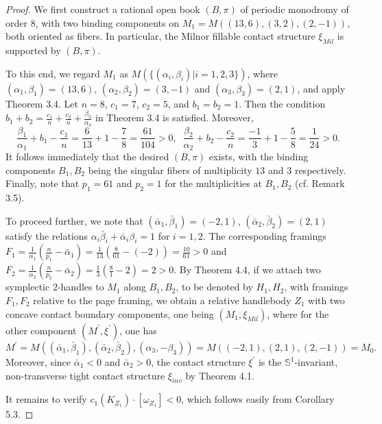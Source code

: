 \documentclass[11pt]{amsart}
\theoremstyle{plain}
\numberwithin{theorem}{section}
\theoremstyle{definition}
\newcommand{\s}{{\mathbb S}}
\begin{document}
\begin{proof}
We first construct a rational open book $(B,\pi)$ of periodic monodromy of order $8$, with two binding components on $M_1=M((13,6), (3,2), (2,-1))$, both oriented as fibers. In particular, the Milnor fillable contact structure 
$\xi_{Mil}$ is supported by $(B,\pi)$. 

To this end, we regard $M_1$ as $M(\{(\alpha_i,\beta_i)|i=1,2,3\})$, where 
$(\alpha_1,\beta_1)=(13,6)$, $(\alpha_2,\beta_2)=(3,-1)$ and $(\alpha_3,\beta_3)=(2,1)$, and apply
Theorem 3.4. Let $n=8$, $c_1=7$, $c_2=5$, and $b_1=b_2=1$. Then the condition $b_1+b_2=\frac{c_1}{n}+\frac{c_2}{n}+\frac{\beta_3}{\alpha_3}$ in Theorem 3.4 is satisfied. Moreover,
$$
\frac{\beta_1}{\alpha_1}+b_1-\frac{c_1}{n}=\frac{6}{13}+1-\frac{7}{8}=\frac{61}{104}>0, \;\;
\frac{\beta_2}{\alpha_2}+b_2-\frac{c_2}{n}=\frac{-1}{3}+1-\frac{5}{8}=\frac{1}{24}>0.
$$
It follows immediately that the desired $(B,\pi)$ exists, with the binding components $B_1,B_2$ being the singular fibers of multiplicity $13$ and $3$ respectively. Finally, note that $p_1=61$ and $p_2=1$
for the multiplicities at $B_1,B_2$ (cf. Remark 3.5). 

To proceed further,  we note that $(\bar{\alpha}_1, \bar{\beta}_1)=(-2,1)$, 
$(\bar{\alpha}_2, \bar{\beta}_2)=(2,1)$ satisfy the relations $\alpha_i\bar{\beta}_i+\bar{\alpha}_i\beta_i=1$ for $i=1,2$. The corresponding framings $F_1=\frac{1}{\alpha_1}(\frac{n}{p_1}-\bar{\alpha}_1)=\frac{1}{13}(\frac{8}{61}-(-2))=\frac{10}{61}>0$ and $F_2=\frac{1}{\alpha_2}(\frac{n}{p_2}-\bar{\alpha}_2)=\frac{1}{3}(\frac{8}{1}-2)=2>0$. By Theorem 4.4, if we attach two symplectic $2$-handles to $M_1$ along $B_1, B_2$, to be denoted by $H_1,H_2$, with framings $F_1,F_2$ relative to the page framing, we obtain a relative handlebody $Z_1$ with two concave contact boundary components, one being $(M_1,\xi_{Mil})$, where for the other component 
$(M^\prime,\xi^\prime)$, one has 
$$
M^\prime=M((\bar{\alpha}_1,\bar{\beta}_1), (\bar{\alpha}_2,\bar{\beta}_2), (\alpha_3,-\beta_3))=
M((-2,1), (2,1), (2,-1))=M_0.
$$
Moreover, since $\bar{\alpha}_1<0$ and $\bar{\alpha}_2>0$, the contact structure $\xi^\prime$ is 
the $\s^1$-invariant, non-transverse tight contact structure $\xi_{inv}$ by Theorem 4.1.

It remains to verify $c_1(K_{Z_1})\cdot [\omega_{Z_1}]<0$, which follows easily from Corollary 5.3. 



\end{proof}
\end{document}
